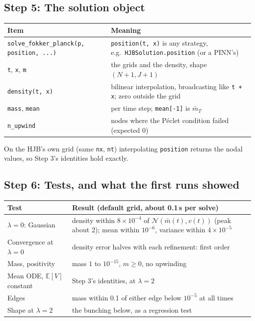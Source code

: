 \documentclass[11pt]{article}
\newcommand{\E}{\mathbb{E}}
\newcommand{\mb}{\bar m}
\begin{document}
\subsection*{Step 5: The solution object}
\begin{center}
\small
\begin{tabular}{@{}l>{\raggedright\arraybackslash}p{}@{}}
\toprule
Item & Meaning \\
\midrule
\texttt{solve\_fokker\_planck(p, position, ...)} & \texttt{position(t, x)} is any strategy,
  e.g.\ \texttt{HJBSolution.position} (or a PINN's) \\
\texttt{t}, \texttt{x}, \texttt{m} & the grids and the density, shape $(N+1,J+1)$ \\
\texttt{density(t, x)} & bilinear interpolation, broadcasting like \texttt{t + x}; zero outside
  the grid \\
\texttt{mass}, \texttt{mean} & per time step; \texttt{mean[-1]} is $\mb_T$ \\
\texttt{n\_upwind} & nodes where the P\'eclet condition failed (expected 0) \\
\bottomrule
\end{tabular}
\end{center}
On the HJB's own grid (same \texttt{nx}, \texttt{nt}) interpolating \texttt{position} returns the
nodal values, so Step 3's identities hold exactly.

\subsection*{Step 6: Tests, and what the first runs showed}
\begin{center}
\small
\begin{tabular}{@{}p{}p{}@{}}
\toprule
Test & Result (default grid, about 0.1\,s per solve) \\
\midrule
$\lambda=0$: Gaussian & density within $8\times10^{-4}$ of $\mathcal N(\mb(t),v(t))$ (peak
  about 2); mean within $10^{-6}$, variance within $4\times10^{-5}$ \\
Convergence at $\lambda=0$ & density error halves with each refinement: first order \\
Mass, positivity & mass $1$ to $10^{-15}$, $m\ge0$, no upwinding \\
Mean ODE, $\E[V]$ constant & Step 3's identities, at $\lambda=2$ \\
Edges & mass within 0.1 of either edge below $10^{-5}$ at all times \\
Shape at $\lambda=2$ & the bunching below, as a regression test \\
\bottomrule
\end{tabular}
\end{center}
\end{document}
